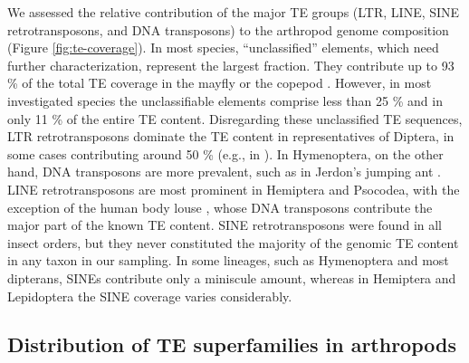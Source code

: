 We assessed the relative contribution of the major TE groups (LTR, LINE,
SINE retrotransposons, and DNA transposons) to the arthropod genome
composition (Figure \ref{fig:te-coverage}). In most species,
``unclassified'' elements, which need further characterization,
represent the largest fraction. They contribute up to 93 \% of the total
TE coverage in the mayfly  or the copepod
.  However, in most investigated
 species the unclassifiable elements comprise less
than 25 \% and in  only 11 \% of the entire TE
content. Disregarding these unclassified TE sequences, LTR
retrotransposons dominate the TE content in representatives of Diptera,
in some cases contributing around 50 \% (e.g., in ). In Hymenoptera, on the other hand, DNA transposons are more
prevalent, such as in Jerdon's jumping ant . LINE retrotransposons are most prominent in Hemiptera and
Psocodea, with the exception of the human body louse , whose DNA transposons contribute the major part of the known
TE content. SINE retrotransposons were found in all insect orders, but
they never constituted the majority of the genomic TE content in any
taxon in our sampling. In some lineages, such as Hymenoptera and most
dipterans, SINEs contribute only a miniscule amount, whereas in
Hemiptera and Lepidoptera the SINE coverage varies considerably.



\subsection{Distribution of TE superfamilies in
arthropods}\label{distribution-of-te-superfamilies-in-arthropods}

